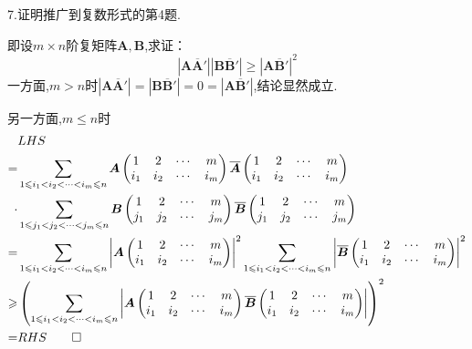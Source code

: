 7.证明推广到复数形式的第4题.
\begin{Proof}
即设$m\times n$阶复矩阵$\bm{A},\bm{B}$,求证：
\[
\left|
    \bm{A}\overline{\bm{A}}'
\right|\left|
    \bm{B}\overline{\bm{B}}'
\right|\geqslant
\left|
    \bm{A}\overline{\bm{B}}'
\right|^2
\]
一方面,$m>n$时$\left|
    \bm{A}\overline{\bm{A}}'
\right|=\left|
    \bm{B}\overline{\bm{B}}'
\right|=0=\left|
    \bm{A}\overline{\bm{B}}'
\right|$,结论显然成立.

另一方面,$m\leqslant n$时
\begin{align*}
    &LHS\\
    =&\sum_{
        1\leqslant i_1<i_2<\cdots<i_m\leqslant n
    }\bm{A}\begin{pmatrix}
        1&2&\cdots&m\\
        i_1&i_2&\cdots&i_m
    \end{pmatrix}\overline{\bm{A}}\begin{pmatrix}
        1&2&\cdots&m\\
        i_1&i_2&\cdots&i_m
    \end{pmatrix}\\
    \cdot &\sum_{
        1\leqslant j_1<j_2<\cdots<j_m\leqslant n
    }\bm{B}\begin{pmatrix}
        1&2&\cdots&m\\
        j_1&j_2&\cdots&j_m
    \end{pmatrix}\overline{\bm{B}}\begin{pmatrix}
        1&2&\cdots&m\\
        j_1&j_2&\cdots&j_m
    \end{pmatrix}\\
    =&\sum _{
        1\leqslant i_1<i_2<\cdots<i_m\leqslant n
    }\left|
        \bm{A}\begin{pmatrix}
            1&2&\cdots&m\\
            i_1&i_2&\cdots&i_m 
        \end{pmatrix}
    \right|^2\sum _{
        1\leqslant i_1<i_2<\cdots<i_m\leqslant n
    }\left|
        \overline{\bm{B}}\begin{pmatrix}
            1&2&\cdots&m\\
            i_1&i_2&\cdots&i_m 
        \end{pmatrix}
    \right|^2\\
    \geqslant&\left(
        \sum_{
            1\leqslant i_1<i_2<\cdots<i_m\leqslant n
        }\left|
            \bm{A}\begin{pmatrix}
                1&2&\cdots&m\\
                i_1&i_2&\cdots&i_m 
            \end{pmatrix}
            \overline{\bm{B}}\begin{pmatrix}
                1&2&\cdots&m\\
                i_1&i_2&\cdots&i_m 
            \end{pmatrix}  
        \right|
    \right)^2\\
    =&RHS\qedhere
\end{align*}
\end{Proof}